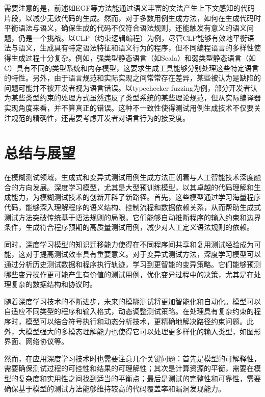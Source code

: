 \documentclass[10.5pt,compsoc]{CjC}
\theoremstyle{mystyle}
\begin{document}
需要注意的是，前述如EGF等方法能通过语义丰富的文法产生上下文感知的代码片段，以减少无效代码的生成。然而，对于多数用例生成方法，如何在生成代码时平衡语法与语义，确保生成的代码不仅符合语法规则，还能触发有意义的语义问题，仍是一个挑战。以CLP（约束逻辑编程）为例，尽管CLP能够有效地平衡语法与语义，生成具有特定语法特征和语义行为的程序，但不同编程语言的多样性使得生成过程十分复杂\cite{Dewey}。例如，强类型静态语言（如Scala）和弱类型静态语言（如C）具有不同的类型系统和内存模型，这要求生成工具能够分别处理这些特定语言的特性。另外，由于语言规范和实际实现之间常常存在差异，某些被认为是缺陷的问题可能并不被开发者视为语言错误。以typechecker fuzzing为例，部分开发者认为某些类型约束的处理方式虽然违反了类型系统的某些理论规范，但从实际编译器实现角度来看，并不算真正的错误\cite{Dewey}。这种不一致性使得测试用例生成技术不仅要关注规范的精确性，还需要考虑开发者对语言行为的接受度。

\vspace{10mm}


\section{总结与展望}

在模糊测试领域，生成式和变异式测试用例生成方法正朝着与人工智能技术深度融合的方向发展。深度学习模型，尤其是大型预训练模型，以其卓越的代码理解和生成能力，为模糊测试技术的创新开辟了新路径。首先，这些模型通过学习海量程序代码，能够深入理解程序的语义结构、控制流程和数据依赖关系，从而帮助生成式测试方法突破传统基于语法规则的局限。它们能够自动推断程序的输入约束和边界条件，生成符合程序预期的高质量测试用例，减少对人工定义语法规则的依赖。

同时，深度学习模型的知识迁移能力使得在不同程序间共享和复用测试经验成为可能，这对于提高测试效率具有重要意义。对于变异式测试方法，深度学习模型可以通过分析历史测试数据和程序执行轨迹，学习到更智能的变异策略。它们能够预测哪些变异操作更可能产生有价值的测试用例，优化变异过程中的决策，尤其是在处理复杂的数据结构和协议时。

随着深度学习技术的不断进步，未来的模糊测试将更加智能化和自动化。模型可以自适应不同类型的程序和输入格式，动态调整测试策略。在处理具有复杂约束的程序时，模型可以结合符号执行和动态分析技术，更精确地解决路径约束问题。此外，大模型强大的多模态理解能力也使得它可以处理更多样化的输入类型，如图形界面、网络协议等。

然而，在应用深度学习技术时也需要注意几个关键问题：首先是模型的可解释性，需要确保测试过程的可控性和结果的可理解性；其次是计算资源的平衡，需要在模型的复杂度和实用性之间找到适当的平衡点；最后是测试的完整性和可靠性，需要确保基于模型的测试方法能够维持较高的代码覆盖率和漏洞发现能力。
\end{document}
